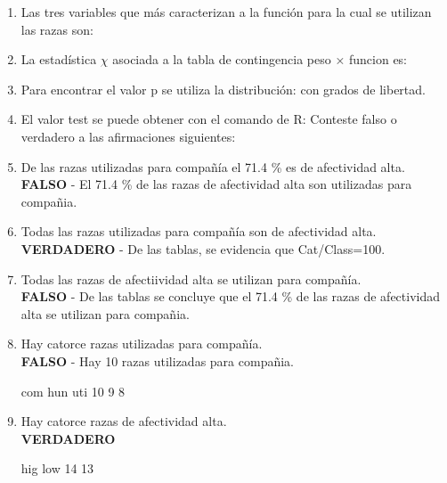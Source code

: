 \documentclass[letterpaper, 12pt]{article}
\begin{document}
\newpage 
\begin{enumerate}

\item Las tres variables que más caracterizan a la función para la cual se
utilizan las razas son: 

\item La estadística $\chi$ asociada a la tabla de contingencia peso × funcion
es:
\item Para encontrar el valor p se utiliza la distribución: con grados de libertad.
\item El valor test se puede obtener con el comando de R:
Conteste falso o verdadero a las afirmaciones siguientes:
\item De las razas utilizadas para compañía el 71.4 \% es de afectividad alta.\\
\textbf{FALSO} - El 71.4 \% de las razas de afectividad alta son utilizadas para 
compañia.
\item Todas las razas utilizadas para compañía son de afectividad alta.\\
\textbf{VERDADERO} - De las tablas, se evidencia que Cat/Class=100.
\item Todas las razas de afectiividad alta se utilizan para compañía.\\
\textbf{FALSO} - De las tablas se concluye que el 71.4 \% de las razas de afectividad alta
se utilizan para compañia.
\item Hay catorce razas utilizadas para compañía.\\
\textbf{FALSO} - Hay 10 razas utilizadas para compañia.
\begin{Schunk}
\begin{Soutput}
com hun uti 
 10   9   8 
\end{Soutput}
\end{Schunk}
\item Hay catorce razas de afectividad alta.\\
\textbf{VERDADERO}
\begin{Schunk}
\begin{Soutput}
hig low 
 14  13 
\end{Soutput}

\end{Schunk}
\end{enumerate}
\end{document}
